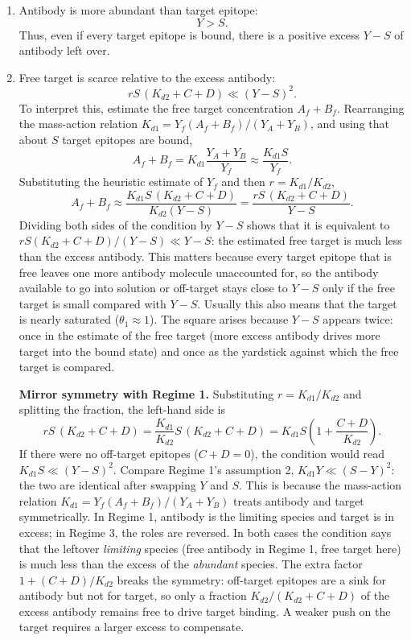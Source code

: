 \begin{enumerate}
    \item Antibody is more abundant than target epitope:
    $$
    Y>S.
    $$
    Thus, even if every target epitope is bound, there is a positive
    excess $Y-S$ of antibody left over.

    \item Free target is scarce relative to the excess antibody:
    $$
    rS\,(K_{d2}+C+D)\ll(Y-S)^2.
    $$
    To interpret this, estimate the free target concentration
    $A_f+B_f$. Rearranging the mass-action relation
    $K_{d1}=Y_f(A_f+B_f)/(Y_A+Y_B)$, and using that about $S$ target
    epitopes are bound,
    $$
    A_f+B_f
    =K_{d1}\frac{Y_A+Y_B}{Y_f}
    \approx\frac{K_{d1}S}{Y_f}.
    $$
    Substituting the heuristic estimate of $Y_f$ and then
    $r=K_{d1}/K_{d2}$,
    $$
    A_f+B_f
    \approx\frac{K_{d1}S\,(K_{d2}+C+D)}{K_{d2}(Y-S)}
    =\frac{rS\,(K_{d2}+C+D)}{Y-S}.
    $$
    Dividing both sides of the condition by $Y-S$ shows that it is
    equivalent to
    $rS(K_{d2}+C+D)/(Y-S)\ll Y-S$: the estimated free target is much less
    than the excess antibody. This matters because every target epitope
    that is free leaves one more antibody molecule unaccounted for, so the
    antibody available to go into solution or off-target stays close to
    $Y-S$ only if the free target is small compared with $Y-S$. Usually
    this also means that the target is nearly saturated
    ($\theta_1\approx1$). The square arises because $Y-S$ appears twice:
    once in the estimate of the free target (more excess antibody drives
    more target into the bound state) and once as the yardstick against
    which the free target is compared.

    \textbf{Mirror symmetry with Regime 1.} Substituting
    $r=K_{d1}/K_{d2}$ and splitting the fraction, the left-hand side is
    $$
    rS\,(K_{d2}+C+D)
    =\frac{K_{d1}}{K_{d2}}S\,(K_{d2}+C+D)
    =K_{d1}S\left(1+\frac{C+D}{K_{d2}}\right).
    $$
    If there were no off-target epitopes ($C+D=0$), the condition would
    read $K_{d1}S\ll(Y-S)^2$. Compare Regime 1's assumption 2,
    $K_{d1}Y\ll(S-Y)^2$: the two are identical after swapping $Y$ and
    $S$. This is because the mass-action relation
    $K_{d1}=Y_f(A_f+B_f)/(Y_A+Y_B)$ treats antibody and target
    symmetrically. In Regime 1, antibody is the limiting species and target
    is in excess; in Regime 3, the roles are reversed. In both cases the
    condition says that the leftover \emph{limiting} species (free antibody
    in Regime 1, free target here) is much less than the excess of the
    \emph{abundant} species. The extra factor $1+(C+D)/K_{d2}$ breaks the
    symmetry: off-target epitopes are a sink for antibody but not for
    target, so only a fraction $K_{d2}/(K_{d2}+C+D)$ of the excess
    antibody remains free to drive target binding. A weaker push on the
    target requires a larger excess to compensate.


\end{enumerate}
